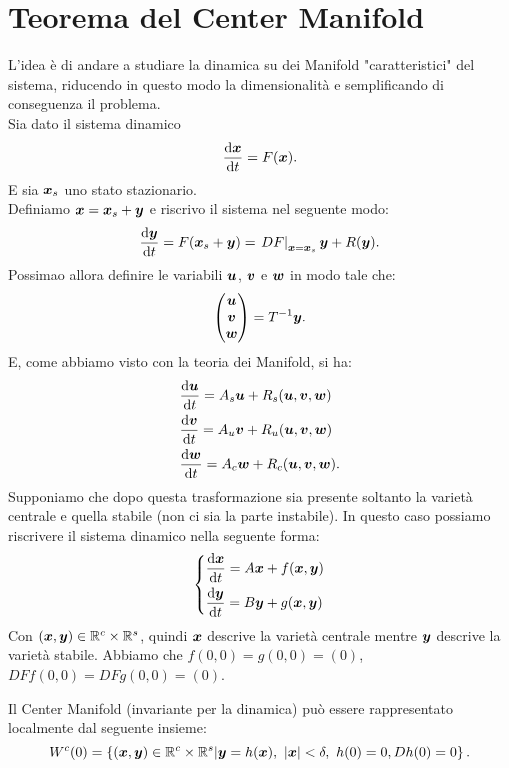 \section{Teorema del Center Manifold}%
L'idea è di andare a studiare la dinamica su dei Manifold "caratteristici" del sistema, riducendo in questo modo la dimensionalità e semplificando di conseguenza il problema.\\
Sia dato il sistema dinamico 
\[
    \frac{\text{d} \boldsymbol{x}}{\text{d} t} = F(\boldsymbol{x}) 
.\] E sia $\boldsymbol{x}_s$ uno stato stazionario.\\
Definiamo $\boldsymbol{x}= \boldsymbol{x}_s + \boldsymbol{y}$ e riscrivo il sistema nel seguente modo:
\[
    \frac{\text{d} \boldsymbol{y}}{\text{d} t} = F(\boldsymbol{x}_s + \boldsymbol{y})  = \left.DF\right|_{\boldsymbol{x}=\boldsymbol{x}_s}\boldsymbol{y} + R(\boldsymbol{y}) 
.\] 
Possimao allora definire le variabili $\boldsymbol{u}$, $\boldsymbol{v}$ e $\boldsymbol{w}$ in modo tale che:
\[
    \begin{pmatrix} \boldsymbol{u} \\ \boldsymbol{v}\\\boldsymbol{w} \end{pmatrix}= T^{-1}\boldsymbol{y}
.\] 
E, come abbiamo visto con la teoria dei Manifold, si ha:
\[\begin{aligned}
    & \frac{\text{d} \boldsymbol{u}}{\text{d} t} = A_s\boldsymbol{u}+ R_s(\boldsymbol{u}, \boldsymbol{v}, \boldsymbol{w}) \\
    & \frac{\text{d} \boldsymbol{v}}{\text{d} t} = A_u\boldsymbol{v}+ R_u(\boldsymbol{u}, \boldsymbol{v}, \boldsymbol{w}) \\
    & \frac{\text{d} \boldsymbol{w}}{\text{d} t} = A_c\boldsymbol{w}+ R_c(\boldsymbol{u}, \boldsymbol{v}, \boldsymbol{w}) 
.\end{aligned}\]
Supponiamo che dopo questa trasformazione sia presente soltanto la varietà centrale e quella stabile (non ci sia la parte instabile). In questo caso possiamo riscrivere il sistema dinamico nella seguente forma:
\begin{equation}
\begin{dcases}
    \frac{\text{d} \boldsymbol{x}}{\text{d} t} = A\boldsymbol{x}+  f(\boldsymbol{x}, \boldsymbol{y}) \\
    \frac{\text{d} \boldsymbol{y}}{\text{d} t} = B\boldsymbol{y}+  g(\boldsymbol{x}, \boldsymbol{y}) 
\end{dcases}
\label{eq:CM}
\end{equation}
Con $(\boldsymbol{x}, \boldsymbol{y}) \in \mathbb{R}^c \times \mathbb{R}^s$, quindi $\boldsymbol{x}$ descrive la varietà centrale mentre $\boldsymbol{y}$ descrive la varietà stabile. 
Abbiamo che $f(0, 0) = g(0, 0) = (0)$, $DFf(0, 0) = DFg(0, 0) = (0)$.
\begin{defn}
    Il Center Manifold (invariante per la dinamica) può essere rappresentato localmente dal seguente insieme:
    \[
	W^c(0) = \left\{(\v{x}, \v{y}) \in \mathbb{R}^c\times \mathbb{R}^s|\v{y}=h(\v{x}), \ \left|\v{x}\right|<\delta, \ h(0) = 0, Dh(0) = 0\right\}
    .\] 
\end{defn}

